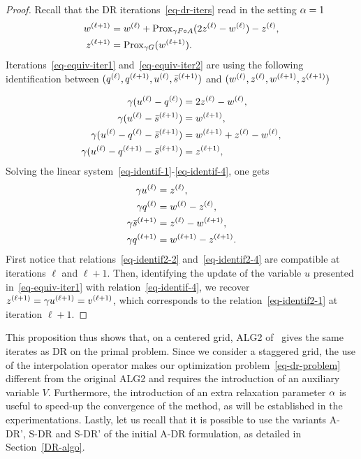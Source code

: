 \begin{proof}
Recall that the DR iterations~\eqref{eq-dr-iters} read in the setting $\alpha=1$
\begin{equation}\label{eq-equiv-iter2}
  		\begin{aligned}
		\iiter{w} &= \iter{w}+\prox_{\ga F \circ A}(2\iter{z}-\iter{w})-\iter{z}, \\
		\iiter{z} &= \prox_{\ga G} (\iiter{w}).
		\end{aligned}
	\end{equation}
	Iterations~\eqref{eq-equiv-iter1} and~\eqref{eq-equiv-iter2} are using the following identification between $({q}^{(\ell)}, {q}^{(\ell+1)},{u}^{(\ell)}, {\bar s}^{(\ell+1)})$ and 
	$({w}^{(\ell)}, {z}^{(\ell)}, {w}^{(\ell+1)}, {z}^{(\ell+1)})$



	\begin{align}
		\ga (\iter{u}-\iter{q})  &= 2\iter{z}-\iter{w},\label{eq-identif-1}\\
		\ga ( \iter{u}-\iiter{\bar s}) &= \iiter{w} , \label{eq-identif-2}\\
		\ga( \iter{u}- \iter{q}   -\iiter{\bar s}   )&= \iiter{w}+\iter{z}-\iter{w}, \label{eq-identif-3}\\
		\ga( \iter{u}-\iiter{q}- \iiter{\bar s}     )&=  \iiter{z}, \label{eq-identif-4}
	\end{align}	
Solving the linear system~\eqref{eq-identif-1}-\eqref{eq-identif-4}, one gets
	\begin{align}
		\ga   \iter{u}  &= \iter{z},\label{eq-identif2-1}\\
		\ga  \iter{q} &= \iter{w}-\iter{z}, \label{eq-identif2-2}\\
		\ga  \iiter{\bar s} &= \iter{z}-\iiter{w}, \label{eq-identif2-3}\\
		\ga\iiter{q}&=\iiter{w}-\iiter{z}. \label{eq-identif2-4}
	\end{align}
First notice that relations~\eqref{eq-identif2-2} and~\eqref{eq-identif2-4} are compatible at iterations $\ell$ and $\ell+1$. 
Then, identifying the update of the variable $u$ presented in~\eqref{eq-equiv-iter1} with  relation~\eqref{eq-identif-4}, we recover ${z}^{(\ell+1)}=\gamma{u}^{(\ell+1)}={v}^{(\ell+1)}$, which corresponds to the relation~\eqref{eq-identif2-1} at iteration $\ell+1$.
\end{proof}

This proposition thus shows that, on a centered grid, ALG2 of~\cite{Benamou2000} gives the same iterates as DR on the primal problem. Since we consider a staggered grid, the use of the interpolation operator makes our optimization problem~\eqref{eq-dr-problem} different from the original ALG2 and requires the introduction of an auxiliary variable $V$. Furthermore, the introduction of an extra relaxation parameter $\alpha$ is useful to speed-up the convergence of the method, as will be established in the experimentations. Lastly, let us recall that it is possible to use the variants A-DR', S-DR and S-DR' of the initial A-DR formulation, as detailed in Section~\ref{DR-algo}. 


